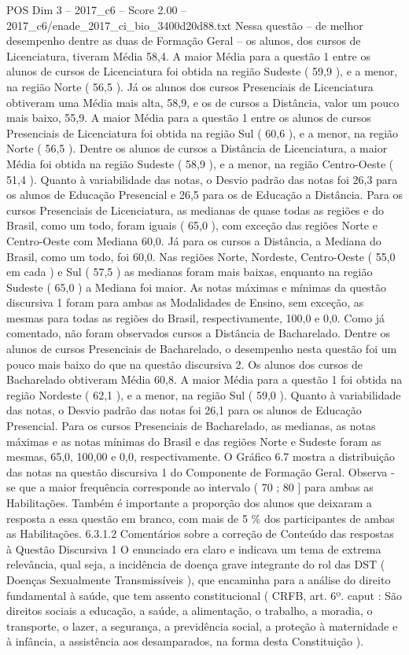 \begin{textsample}{POS Dim 3 – 2017\_c6 – Score 2.00 – 2017\_c6/enade\_2017\_ci\_bio\_3400d20d88.txt}
Nessa questão – de melhor desempenho dentre as duas de Formação Geral – os alunos, dos cursos de Licenciatura, tiveram Média 58,4.
A maior Média para a questão 1 entre os alunos de cursos de Licenciatura foi obtida na região Sudeste ( 59,9 ), e a menor, na região Norte ( 56,5 ).
Já os alunos dos cursos Presenciais de Licenciatura obtiveram uma Média mais alta, 58,9, e os de cursos a Distância, valor um pouco mais baixo, 55,9.
A maior Média para a questão 1 entre os alunos de cursos Presenciais de Licenciatura foi obtida na região Sul ( 60,6 ), e a menor, na região Norte ( 56,5 ).
Dentre os alunos de cursos a Distância de Licenciatura, a maior Média foi obtida na região Sudeste ( 58,9 ), e a menor, na região Centro-Oeste ( 51,4 ).
Quanto à variabilidade das notas, o Desvio padrão das notas foi 26,3 para os alunos de Educação Presencial e 26,5 para os de Educação a Distância.
Para os cursos Presenciais de Licenciatura, as medianas de quase todas as regiões e do Brasil, como um todo, foram iguais ( 65,0 ), com exceção das regiões Norte e Centro-Oeste com Mediana 60,0.
Já para os cursos a Distância, a Mediana do Brasil, como um todo, foi 60,0.
Nas regiões Norte, Nordeste, Centro-Oeste ( 55,0 em cada ) e Sul ( 57,5 ) as medianas foram mais baixas, enquanto na região Sudeste ( 65,0 ) a Mediana foi maior.
As notas máximas e mínimas da questão discursiva 1 foram para ambas as Modalidades de Ensino, sem exceção, as mesmas para todas as regiões do Brasil, respectivamente, 100,0 e 0,0.
Como já comentado, não foram observados cursos a Distância de Bacharelado.
Dentre os alunos de cursos Presenciais de Bacharelado, o desempenho nesta questão foi um pouco mais baixo do que na questão discursiva 2.
Os alunos dos cursos de Bacharelado obtiveram Média 60,8.
A maior Média para a questão 1 foi obtida na região Nordeste ( 62,1 ), e a menor, na região Sul ( 59,0 ).
Quanto à variabilidade das notas, o Desvio padrão das notas foi 26,1 para os alunos de Educação Presencial.
Para os cursos Presenciais de Bacharelado, as medianas, as notas máximas e as notas mínimas do Brasil e das regiões Norte e Sudeste foram as mesmas, 65,0, 100,00 e 0,0, respectivamente.
O Gráfico 6.7 mostra a distribuição das notas na questão discursiva 1 do Componente de Formação Geral.
Observa -se que a maior frequência corresponde ao intervalo ( 70 ; 80 ] para ambas as Habilitações.
Também é importante a proporção dos alunos que deixaram a resposta a essa questão em branco, com mais de 5 \% dos participantes de ambas as Habilitações. 6.3.1.2 Comentários sobre a correção de Conteúdo das respostas à Questão Discursiva 1 O enunciado era claro e indicava um tema de extrema relevância, qual seja, a incidência de doença grave integrante do rol das DST ( Doenças Sexualmente Transmissíveis ), que encaminha para a análise do direito fundamental à saúde, que tem assento constitucional ( CRFB, art. 6º. caput : São direitos sociais a educação, a saúde, a alimentação, o trabalho, a moradia, o transporte, o lazer, a segurança, a previdência social, a proteção à maternidade e à infância, a assistência aos desamparados, na forma desta Constituição ).

\end{textsample}
